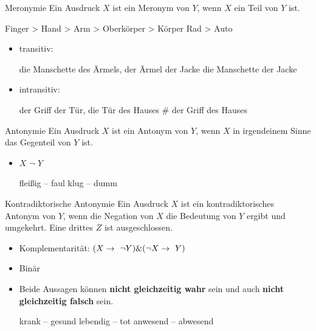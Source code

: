 \begin{frame}

\begin{block}{Meronymie}
Ein Ausdruck $X$ ist ein Meronym von $Y$, wenn $X$ ein Teil von $Y$ ist.
\end{block}

	\eal
	\ex Finger > Hand > Arm > Oberkörper > Körper
	\ex Rad > Auto
	\zl

\begin{itemize}	
	\item transitiv: 
		
	\ea die Manschette des Ärmels, der Ärmel der Jacke \ras die Manschette der Jacke
	\z
		
	\item intransitiv: 
		
	\ea der Griff der Tür, die Tür des Hauses \ras \# der Griff des Hauses
	\z
		
\end{itemize}

\end{frame}


\begin{frame}

\begin{block}{Antonymie}
Ein Ausdruck $X$ ist ein Antonym von $Y$, wenn $X$ in irgendeinem Sinne das Gegenteil von $Y$ ist.
\end{block}

\begin{itemize}
	\item $X$ \ras $\lnot$ $Y$
	
	\eal 
		\ex fleißig -- faul
		\ex klug -- dumm
	\zl
	
\end{itemize}

\end{frame}



\begin{frame}

\begin{block}{Kontradiktorische Antonymie}
Ein Ausdruck $X$ ist ein kontradiktorisches Antonym von $Y$, wenn die Negation von $X$ die Bedeutung von $Y$ ergibt und umgekehrt. Eine drittes $Z$ ist ausgeschlossen.
\end{block}

\begin{itemize}
	\item Komplementarität: $(X \rightarrow\  \lnot Y) \& (\lnot X  \rightarrow\  Y)$
	\item Binär
	\item Beide Aussagen können \textbf{nicht gleichzeitig wahr} sein und auch \textbf{nicht gleichzeitig falsch} sein.
	
	\eal
		\ex krank -- gesund
		\ex lebendig -- tot
		\ex anwesend -- abwesend
	\zl
	
\end{itemize}

\end{frame}


